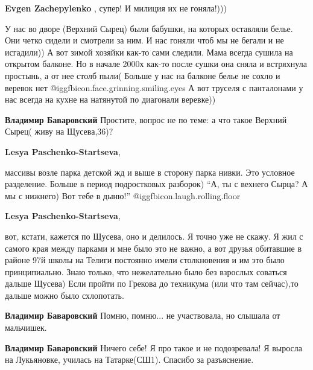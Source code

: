 \begin{itemize}
\begin{itemize}
\begin{itemize}
\end{itemize} %

\textbf{Evgen Zachepylenko} , супер! И милиция их не гоняла!)))

\end{itemize} %


У нас во дворе (Верхний Сырец) были бабушки, на которых оставляли белье. Они
четко сидели и смотрели за ним. И нас гоняли чтоб мы не бегали и не исгадили))
А вот зимой хозяйки как-то сами следили. Мама всегда сушила на открытом
балконе. Но в начале 2000х как-то после сушки она сняла и встряхнула простынь,
а от нее столб пыли( Больше у нас на балконе белье не сохло и веревок нет
@igg{fbicon.face.grinning.smiling.eyes}  А вот труселя с панталонами у нас
всегда на кухне на натянутой по диагонали веревке))

\begin{itemize} %
\textbf{Владимир Баваровский} Простите, вопрос не по теме: а что такое Верхний Сырец( живу на Щусева,36)?

\begin{itemize} %
\textbf{Lesya Paschenko-Startseva}, 

массивы возле парка детской жд и выше в сторону парка нивки. Это условное
разделение. Больше в период подростковых разборок) \enquote{А, ты с вехнего Сырца? А мы
с нижнего) Вот тебе в дыню!}  @igg{fbicon.laugh.rolling.floor} 


\textbf{Lesya Paschenko-Startseva}, 

вот, кстати, кажется по Щусева, оно и делилось. Я точно уже не скажу. Я жил с
самого края между парками и мне было это не важно, а вот друзья обитавшие в
районе 97й школы на Телиги постоянно имели столкновения и им это было
принципиально. Знаю только, что нежелательно было без взрослых соваться дальше
Щусева) Если пройти по Грекова до техникума (или что там сейчас),то дальше
можно было схлопотать.


\textbf{Владимир Баваровский} Помню, помню... не участвовала, но слышала от мальчишек.

\textbf{Владимир Баваровский} Ничего себе! Я про такое и не подозревала! Я выросла на Лукьяновке, училась на Татарке(СШ1). Спасибо за разъяснение.
\end{itemize} %


\end{itemize}
\end{itemize}
